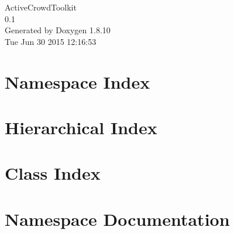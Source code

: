 \documentclass[twoside]{book}
\newcommand{\+}{\discretionary{\mbox{\scriptsize$\hookleftarrow$}}{}{}}
\newcommand{\clearemptydoublepage}{%
  \newpage{\pagestyle{empty}\cleardoublepage}%
}
\begin{document}
\hypersetup{pageanchor=false,
             bookmarks=true,
             bookmarksnumbered=true,
             pdfencoding=unicode
            }
\begin{titlepage}
\vspace*{7cm}
\begin{center}%
{\Large Active\+Crowd\+Toolkit \\[1ex]\large 0.\+1 }\\
\vspace*{1cm}
{\large Generated by Doxygen 1.8.10}\\
\vspace*{0.5cm}
{\small Tue Jun 30 2015 12:16:53}\\
\end{center}
\end{titlepage}
\clearemptydoublepage
\tableofcontents
\clearemptydoublepage
{}
\hypersetup{pageanchor=true}

\chapter{Namespace Index}

\chapter{Hierarchical Index}

\chapter{Class Index}

\chapter{Namespace Documentation}








\end{document}
